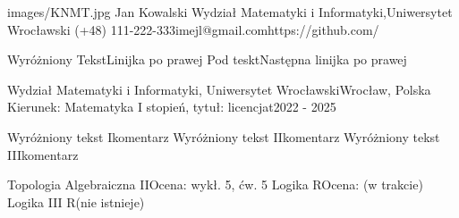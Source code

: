 \documentclass[a4paper, 10pt]{article}
\begin{document}
    
    \cvtitle
    {images/KNMT.jpg} %
    {Jan Kowalski} %
    {Wydział Matematyki i Informatyki,}{Uniwersytet Wrocławski} %
    {(+48) 111-222-333}{imejl@gmail.com}{https://github.com/} %



        
            \cventry %
            {Wyróżniony Tekst}{Linijka po prawej}                                         
            {Pod teskt}{Następna linijka po prawej}                       

            \cventry %
            {Wydział Matematyki i Informatyki, Uniwersytet Wrocławski}{Wrocław, Polska}  
            {Kierunek: Matematyka I stopień, tytuł: licencjat}{2022 - 2025}


            \cvtable %
            {Wyróżniony tekst I}{komentarz}
            {Wyróżniony tekst II}{komentarz}
            {Wyróżniony tekst III}{komentarz}


            \cvtable
            {Topologia Algebraiczna II}{Ocena: wykł. 5, ćw. 5}
            {Logika R}{Ocena: (w trakcie)}
            {Logika III R}{(nie istnieje)}
\end{document}
